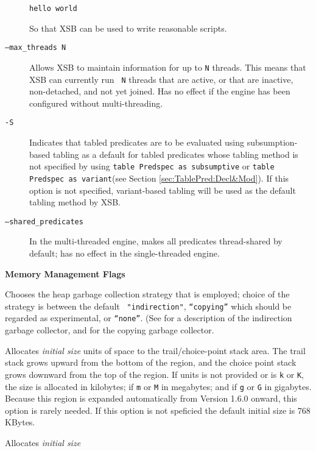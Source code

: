 \begin{description}
\begin{description}
\begin{verbatim}
hello world
\end{verbatim}
So that XSB can be used to write reasonable scripts.
%
\item[{\tt --max\_threads N}] Allows XSB to maintain information for
  up to {\tt N} threads.  This means that XSB can currently run {\tt
    N} threads that are active, or that are inactive, non-detached,
  and not yet joined.  Has no effect if the engine has been configured
  without multi-threading.
\item[{\tt -S}] Indicates that tabled predicates are to be evaluated
  using subsumption-based tabling as a default for tabled predicates
  whose tabling method is not specified by using {\tt table Predspec
    as subsumptive} or {\tt table Predspec as variant}(see Section
  \ref{sec:TablePred:Decl&Mod}).  If this option is not specified,
  variant-based tabling will be used as the default tabling method by
  XSB\@.  
\item[{\tt --shared\_predicates}] In the multi-threaded engine, makes
    all predicates thread-shared by default; has no effect in the
    single-threaded engine.
\end{description}
\item {\bf Memory Management Flags}
\begin{description}
\item[{\tt -g gc\_type}] Chooses the heap garbage collection strategy
  that is employed; choice of the strategy is between the default {\tt
    "indirection"}, {\tt ``copying''} which should be regarded as
  experimental, or {\tt ``none''}. (See \cite{CaSC01} for a
  description of the indirection garbage collector, and
  \cite{CATmem@ISMM-98} for the copying garbage collector.
%
\item[{\tt -c} {\em size [units]}] Allocates {\em initial size\/} units of
  space to the trail/choice-point stack area.  The trail stack grows
  upward from the bottom of the region, and the choice point stack
  grows downward from the top of the region.  If units is not provided
  or is {\tt k} or {\tt K}, the size is allocated in kilobytes; if
  {\tt m} or {\tt M} in megabytes; and if {\tt g} or {\tt G} in
  gigabytes.  Because this region is expanded automatically from
  Version 1.6.0 onward, this option is rarely needed.  If this option
  is not speficied the default initial size is 768 KBytes.
%
\item[{\tt -m} {\em size [units]}] Allocates {\em initial size\/}

\end{description}
\end{description}
